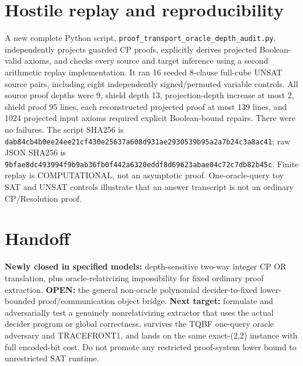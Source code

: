 \documentclass[11pt]{article}
\begin{document}
\section{Hostile replay and reproducibility}
A new complete Python script, \texttt{proof\_transport\_oracle\_depth\_audit.py}, independently projects guarded CP proofs, explicitly derives projected Boolean-valid axioms, and checks every source and target inference using a second arithmetic replay implementation. It ran 16 seeded 8-clause full-cube UNSAT source pairs, including eight independently signed/permuted variable controls. All source proof depths were 9, shield depth 13, projection-depth increase at most 2, shield proof 95 lines, each reconstructed projected proof at most 139 lines, and 1024 projected input axioms required explicit Boolean-bound repairs. There were no failures. The script SHA256 is \texttt{dab84cb4b0ee24ee21cf430e25637a608d931ae2930539b95a2a7b24c3a8ac41}; raw JSON SHA256 is \texttt{9bfae8dc493994f9b9ab36fb0f442a6320eddf8d69623abae04c72c7db82b45c}. Finite replay is COMPUTATIONAL, not an asymptotic proof. One-oracle-query toy SAT and UNSAT controls illustrate that an answer transcript is not an ordinary CP/Resolution proof.

\section{Handoff}
\noindent \textbf{Newly closed in specified models:} depth-sensitive two-way integer CP OR translation, plus oracle-relativizing impossibility for fixed ordinary proof extraction. \textbf{OPEN:} the general non-oracle polynomial decider-to-fixed lower-bounded proof/communication object bridge. \textbf{Next target:} formulate and adversarially test a genuinely nonrelativizing extractor that uses the actual decider program or global correctness, survives the TQBF one-query oracle adversary and TRACEFRONT1, and lands on the same exact-(2,2) instance with full encoded-bit cost. Do not promote any restricted proof-system lower bound to unrestricted SAT runtime.
\end{document}
